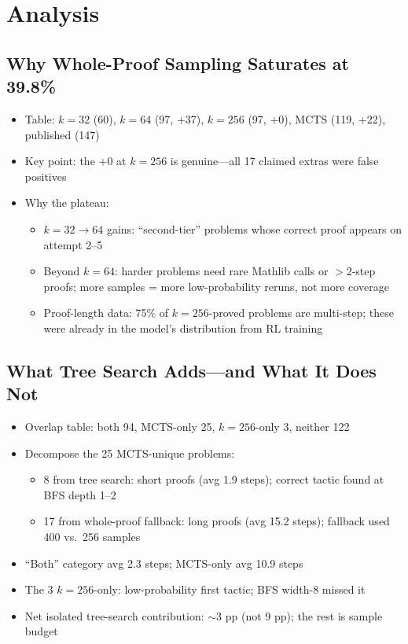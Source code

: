 \documentclass[openany, amssymb, psamsfonts]{amsart}
\begin{document}
\section{Analysis}

\subsection{Why Whole-Proof Sampling Saturates at 39.8\%}
\begin{itemize}
  \item Table: $k=32$ (60), $k=64$ (97, $+$37), $k=256$ (97, $+$0), MCTS (119, $+$22), published (147)
  \item Key point: the $+$0 at $k=256$ is genuine---all 17 claimed extras were false positives
  \item Why the plateau:
  \begin{itemize}
    \item $k=32 \to 64$ gains: ``second-tier'' problems whose correct proof appears on attempt 2--5
    \item Beyond $k=64$: harder problems need rare Mathlib calls or $>$2-step proofs; more samples = more low-probability reruns, not more coverage
    \item Proof-length data: 75\% of $k=256$-proved problems are multi-step; these were already in the model's distribution from RL training
  \end{itemize}
\end{itemize}

\subsection{What Tree Search Adds---and What It Does Not}
\begin{itemize}
  \item Overlap table: both 94, MCTS-only 25, $k=256$-only 3, neither 122
  \item Decompose the 25 MCTS-unique problems:
  \begin{itemize}
    \item 8 from tree search: short proofs (avg 1.9 steps); correct tactic found at BFS depth 1--2
    \item 17 from whole-proof fallback: long proofs (avg 15.2 steps); fallback used 400 vs.\ 256 samples
  \end{itemize}
  \item ``Both'' category avg 2.3 steps; MCTS-only avg 10.9 steps
  \item The 3 $k=256$-only: low-probability first tactic; BFS width-8 missed it
  \item Net isolated tree-search contribution: $\sim$3 pp (not 9 pp); the rest is sample budget
\end{itemize}
\end{document}
